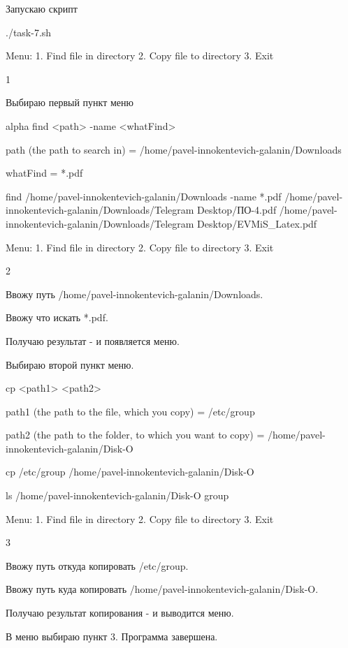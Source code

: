 \newpage

Запускаю скрипт

\begin{OutBox}
./task-7.sh
\end{OutBox}

\begin{OutBox}
Menu:
1. Find file in directory
2. Copy file to directory
3. Exit

1
\end{OutBox}

Выбираю первый пункт меню

\begin{OutBox}
alpha
find <path> -name <whatFind>

path (the path to search in) =
/home/pavel-innokentevich-galanin/Downloads

whatFind =
*.pdf

find /home/pavel-innokentevich-galanin/Downloads -name *.pdf
/home/pavel-innokentevich-galanin/Downloads/Telegram Desktop/ПО-4.pdf
/home/pavel-innokentevich-galanin/Downloads/Telegram Desktop/EVMiS_Latex.pdf


Menu:
1. Find file in directory
2. Copy file to directory
3. Exit

2
\end{OutBox}

Ввожу путь /home/pavel-innokentevich-galanin/Downloads.

Ввожу что искать *.pdf.

Получаю результат - и появляется меню.

Выбираю второй пункт меню.

\newpage

\begin{OutBox}
cp <path1> <path2>

path1 (the path to the file, which you copy) =
/etc/group

path2 (the path to the folder, to which you want to copy) =
/home/pavel-innokentevich-galanin/Disk-O

cp /etc/group /home/pavel-innokentevich-galanin/Disk-O

ls /home/pavel-innokentevich-galanin/Disk-O
group


Menu:
1. Find file in directory
2. Copy file to directory
3. Exit

3
\end{OutBox}

Ввожу путь откуда копировать /etc/group.

Ввожу путь куда копировать /home/pavel-innokentevich-galanin/Disk-O.

Получаю результат копирования - и выводится меню.

В меню выбираю пункт 3. Программа завершена.
